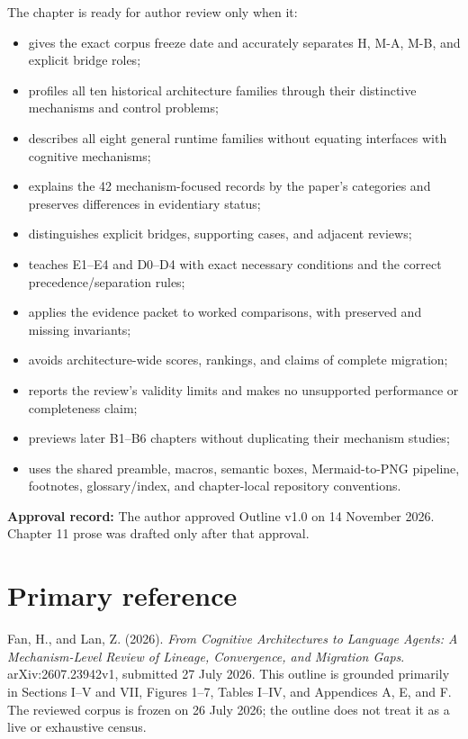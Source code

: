 The chapter is ready for author review only when it:
\begin{itemize}
  \item gives the exact corpus freeze date and accurately separates H, M-A, M-B, and explicit bridge roles;
  \item profiles all ten historical architecture families through their distinctive mechanisms and control problems;
  \item describes all eight general runtime families without equating interfaces with cognitive mechanisms;
  \item explains the 42 mechanism-focused records by the paper's categories and preserves differences in evidentiary status;
  \item distinguishes explicit bridges, supporting cases, and adjacent reviews;
  \item teaches E1--E4 and D0--D4 with exact necessary conditions and the correct precedence/separation rules;
  \item applies the evidence packet to worked comparisons, with preserved and missing invariants;
  \item avoids architecture-wide scores, rankings, and claims of complete migration;
  \item reports the review's validity limits and makes no unsupported performance or completeness claim;
  \item previews later B1--B6 chapters without duplicating their mechanism studies;
  \item uses the shared preamble, macros, semantic boxes, Mermaid-to-PNG pipeline, footnotes, glossary/index, and chapter-local repository conventions.
\end{itemize}

\begin{notebox}
\textbf{Approval record:} The author approved Outline v1.0 on 14 November 2026. Chapter 11 prose was drafted only after that approval.
\end{notebox}

\section*{Primary reference}
Fan, H., and Lan, Z. (2026). \emph{From Cognitive Architectures to Language Agents: A Mechanism-Level Review of Lineage, Convergence, and Migration Gaps}. arXiv:2607.23942v1, submitted 27 July 2026. This outline is grounded primarily in Sections I--V and VII, Figures 1--7, Tables I--IV, and Appendices A, E, and F. The reviewed corpus is frozen on 26 July 2026; the outline does not treat it as a live or exhaustive census.

